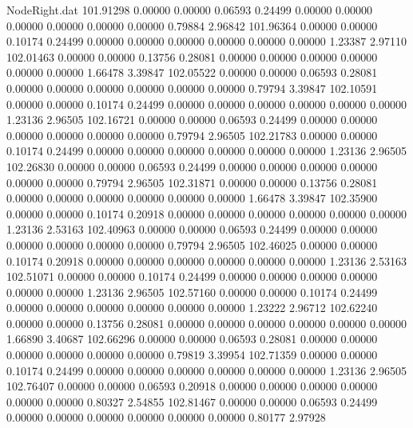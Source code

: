 \begin{filecontents}{NodeRight.dat}
 101.91298    0.00000    0.00000     0.06593    0.24499    0.00000    0.00000    0.00000    0.00000    0.00000    0.00000    0.79884    2.96842
 101.96364    0.00000    0.00000     0.10174    0.24499    0.00000    0.00000    0.00000    0.00000    0.00000    0.00000    1.23387    2.97110
 102.01463    0.00000    0.00000     0.13756    0.28081    0.00000    0.00000    0.00000    0.00000    0.00000    0.00000    1.66478    3.39847
 102.05522    0.00000    0.00000     0.06593    0.28081    0.00000    0.00000    0.00000    0.00000    0.00000    0.00000    0.79794    3.39847
 102.10591    0.00000    0.00000     0.10174    0.24499    0.00000    0.00000    0.00000    0.00000    0.00000    0.00000    1.23136    2.96505
 102.16721    0.00000    0.00000     0.06593    0.24499    0.00000    0.00000    0.00000    0.00000    0.00000    0.00000    0.79794    2.96505
 102.21783    0.00000    0.00000     0.10174    0.24499    0.00000    0.00000    0.00000    0.00000    0.00000    0.00000    1.23136    2.96505
 102.26830    0.00000    0.00000     0.06593    0.24499    0.00000    0.00000    0.00000    0.00000    0.00000    0.00000    0.79794    2.96505
 102.31871    0.00000    0.00000     0.13756    0.28081    0.00000    0.00000    0.00000    0.00000    0.00000    0.00000    1.66478    3.39847
 102.35900    0.00000    0.00000     0.10174    0.20918    0.00000    0.00000    0.00000    0.00000    0.00000    0.00000    1.23136    2.53163
 102.40963    0.00000    0.00000     0.06593    0.24499    0.00000    0.00000    0.00000    0.00000    0.00000    0.00000    0.79794    2.96505
 102.46025    0.00000    0.00000     0.10174    0.20918    0.00000    0.00000    0.00000    0.00000    0.00000    0.00000    1.23136    2.53163
 102.51071    0.00000    0.00000     0.10174    0.24499    0.00000    0.00000    0.00000    0.00000    0.00000    0.00000    1.23136    2.96505
 102.57160    0.00000    0.00000     0.10174    0.24499    0.00000    0.00000    0.00000    0.00000    0.00000    0.00000    1.23222    2.96712
 102.62240    0.00000    0.00000     0.13756    0.28081    0.00000    0.00000    0.00000    0.00000    0.00000    0.00000    1.66890    3.40687
 102.66296    0.00000    0.00000     0.06593    0.28081    0.00000    0.00000    0.00000    0.00000    0.00000    0.00000    0.79819    3.39954
 102.71359    0.00000    0.00000     0.10174    0.24499    0.00000    0.00000    0.00000    0.00000    0.00000    0.00000    1.23136    2.96505
 102.76407    0.00000    0.00000     0.06593    0.20918    0.00000    0.00000    0.00000    0.00000    0.00000    0.00000    0.80327    2.54855
 102.81467    0.00000    0.00000     0.06593    0.24499    0.00000    0.00000    0.00000    0.00000    0.00000    0.00000    0.80177    2.97928

\end{filecontents}
